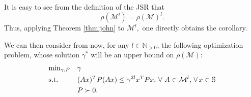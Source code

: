 \begin{pf}
It is easy to see from the definition of the JSR that $$\rho(\mathcal{M}^l)=\rho(\mathcal{M})^l.$$ Thus, applying Theorem \ref{thm:john} to $\mathcal{M}^l,$ one directly obtains the corollary.
\end{pf}
We can then consider from now, for any $l \in \mathbb{N}_{>0}$, the following optimization problem, whose solution $\gamma^{*}$ will be an upper bound on $\rho(\mathcal{M})$:
\begin{equation}\label{eqn:campiOpt2}
\begin{aligned}
& \text{min}_{\gamma, P} & & \gamma \\
& \text{s.t.} 
&  & (Ax)^T P(Ax) \leq \gamma^{2l} x^T P x,\,\forall\ A \in \mathcal{M}^l, \,\forall\, x \in \mathbb{S}\\
& && P \succ 0. \\
\end{aligned}
\end{equation}